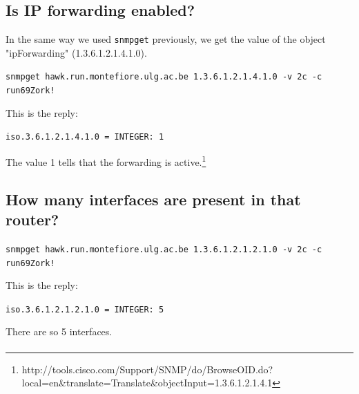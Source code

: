 \documentclass[a4paper,titlepage]{article}
\begin{document}
	\subsection{Is IP forwarding enabled?}
In the same way we used \texttt{snmpget} previously, we get the value of the object "ipForwarding" (1.3.6.1.2.1.4.1.0).
\begin{center}
	\texttt{snmpget hawk.run.montefiore.ulg.ac.be 1.3.6.1.2.1.4.1.0 -v 2c -c run69Zork!}
\end{center}
This is the reply: 
\begin{center}
	\texttt{iso.3.6.1.2.1.4.1.0 = INTEGER: 1}
\end{center}
The value 1 tells that the forwarding is active.\footnote{http://tools.cisco.com/Support/SNMP/do/BrowseOID.do?local=en\&translate=Translate\&objectInput=1.3.6.1.2.1.4.1}

	\subsection{How many interfaces are present in that router?}
\begin{center}
	\texttt{snmpget hawk.run.montefiore.ulg.ac.be 1.3.6.1.2.1.2.1.0 -v 2c -c run69Zork!}
\end{center}
This is the reply: 
\begin{center}
	\texttt{iso.3.6.1.2.1.2.1.0 = INTEGER: 5}
\end{center}
There are so 5 interfaces.

\paragraph{}
\end{document}
